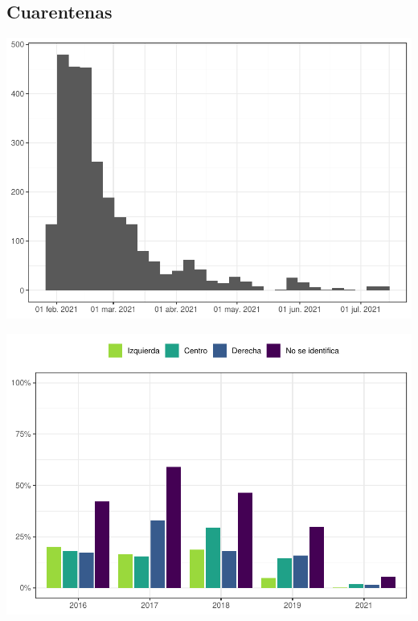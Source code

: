 \documentclass[
  12pt,
]{book}
\begin{document}
\hypertarget{cuarentenas}{%
\subsection{Cuarentenas}\label{cuarentenas}}

\begin{center}\includegraphics{reporte-elsoc_files/figure-latex/hist-fecha-2021-1} \end{center}

\begin{center}\includegraphics{reporte-elsoc_files/figure-latex/unnamed-chunk-7-1} \end{center}
\end{document}

